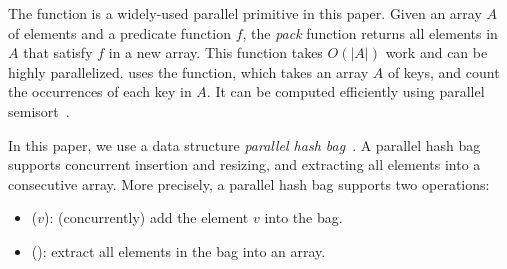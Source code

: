 The \pack{} function is a widely-used parallel primitive in this paper. 
Given an array $A$ of elements and a predicate function $f$, 
the \emph{pack} function returns all elements in $A$ that satisfy $f$ in a new array. 
This function takes $O(|A|)$ work and can be highly parallelized. 
\Julienne{} uses the \FHistogram{} function, which takes an array $A$ of keys, and count the occurrences of each key in $A$.
It can be computed efficiently using parallel semisort~\cite{gu2015top,dong2023high}.




In this paper, we use a data structure \emph{parallel hash bag}~\cite{dong2021efficient,wang2023parallel}. 
A parallel hash bag supports concurrent insertion and resizing, and extracting all elements into a consecutive array. 
More precisely, a parallel hash bag supports two operations:
\begin{itemize}[leftmargin=*,topsep=0pt, partopsep=0pt,itemsep=0pt,parsep=0pt]
  \item \bagput{}($v$): (concurrently) add the element $v$ into the bag.  
  \item \bagpack{}(): extract all elements in the bag into an array. %
\end{itemize}

